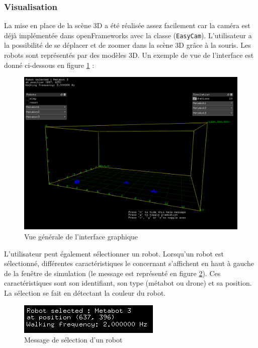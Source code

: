 \subsubsection{Visualisation}

La mise en place de la scène 3D a été réalisée assez facilement car la caméra est déjà implémentée dans openFrameworks avec la classe (\verb|EasyCam|). L'utilisateur a la possibilité de se déplacer et de zoomer dans la scène 3D grâce à la souris. Les robots sont représentés par des modèles 3D. Un exemple de vue de l'interface est donné ci-dessous en figure \ref{interface} :

\begin{figure}[H]
\centering
\includegraphics[scale=0.37]{imgs/view2}
\caption{Vue générale de l'interface graphique}
\label{interface}
\end{figure}

L'utilisateur peut également sélectionner un robot. Lorsqu'un robot est sélectionné, différentes caractéristiques le concernant s'affichent en haut à gauche de la fenêtre de simulation (le message est représenté en figure \ref{mselec}). Ces caractéristiques sont son identifiant, son type (métabot ou drone) et sa position. La sélection se fait en détectant la couleur du robot.

\begin{figure}[H]
\centering
\includegraphics[scale=0.7]{imgs/selection}
\caption{Message de sélection d'un robot}
\label{mselec}
\end{figure}

